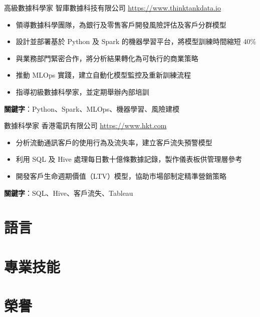 \documentclass[a4paper, serif, 10pt]{moderncv}
\begin{document}
        {高級數據科學家}
        {智庫數據科技有限公司}
        {\url{https://www.thinktankdata.io}}
        {}
        {\begin{itemize}
\item 領導數據科學團隊，為銀行及零售客戶開發風險評估及客戶分群模型
\item 設計並部署基於 Python 及 Spark 的機器學習平台，將模型訓練時間縮短 40\%
\item 與業務部門緊密合作，將分析結果轉化為可執行的商業策略
\item 推動 MLOps 實踐，建立自動化模型監控及重新訓練流程
\item 指導初級數據科學家，並定期舉辦內部培訓
\end{itemize}
\textbf{關鍵字}：Python、Spark、MLOps、機器學習、風險建模}

        {數據科學家}
        {香港電訊有限公司}
        {\url{https://www.hkt.com}}
        {}
        {\begin{itemize}
\item 分析流動通訊客戶的使用行為及流失率，建立客戶流失預警模型
\item 利用 SQL 及 Hive 處理每日數十億條數據記錄，製作儀表板供管理層參考
\item 開發客戶生命週期價值（LTV）模型，協助市場部制定精準營銷策略
\end{itemize}
\textbf{關鍵字}：SQL、Hive、客戶流失、Tableau}
\section{語言}

\section{專業技能}

\section{榮譽}
\end{document}
